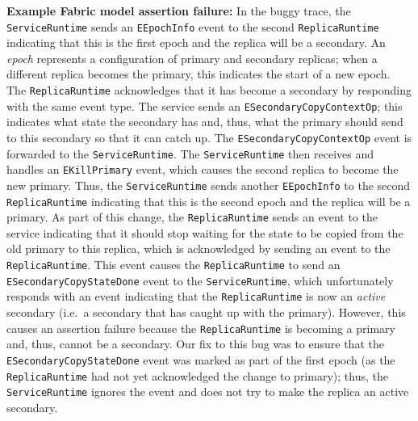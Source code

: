 \textbf{Example Fabric model assertion failure:}
In the buggy trace,
the \texttt{ServiceRuntime}
sends an \texttt{EEpochInfo} event to the second
\texttt{ReplicaRuntime}
indicating that this is the first epoch and the
replica will be a secondary.
An \emph{epoch} represents a configuration of primary and
secondary replicas; when a different replica becomes the primary,
this indicates the start of a new epoch.
The \texttt{ReplicaRuntime} acknowledges that it has become
a secondary by responding with the same event type.
The \psharp{} service sends an \texttt{ESecondaryCopyContextOp};
this indicates what state the secondary has
and, thus, what the primary should send to this secondary so that it can catch
up.
The \texttt{ESecondaryCopyContextOp} event is forwarded to the
\texttt{ServiceRuntime}. 
The \texttt{ServiceRuntime} then receives and handles an \texttt{EKillPrimary}
event, which causes the second replica to become the new primary.
Thus,
the \texttt{ServiceRuntime} sends another \texttt{EEpochInfo}
to the second \texttt{ReplicaRuntime}
indicating that this is the second epoch
and the replica will be a primary.
As part of this change,
the \texttt{ReplicaRuntime}
sends an event to the \psharp{} service
indicating that it should stop waiting for
the state to be copied from the old primary to this replica,
which is acknowledged by sending an event to the \texttt{ReplicaRuntime}.
This event causes the \texttt{ReplicaRuntime}
to send an \texttt{ESecondaryCopyStateDone}
event to the \texttt{ServiceRuntime},
which unfortunately responds with an event indicating that the
\texttt{ReplicaRuntime} is now an \emph{active} secondary
(i.e.\ a secondary that has caught up with the primary).
However, this causes an assertion failure because
the \texttt{ReplicaRuntime} is becoming a primary and, thus,
cannot be a secondary.
Our fix to this bug was to ensure that the 
\texttt{ESecondaryCopyStateDone} event was marked as part of the first
epoch (as the \texttt{ReplicaRuntime} had not yet acknowledged the
change to primary); thus, 
the \texttt{ServiceRuntime} ignores the event and does not try to make the
replica an active secondary.

